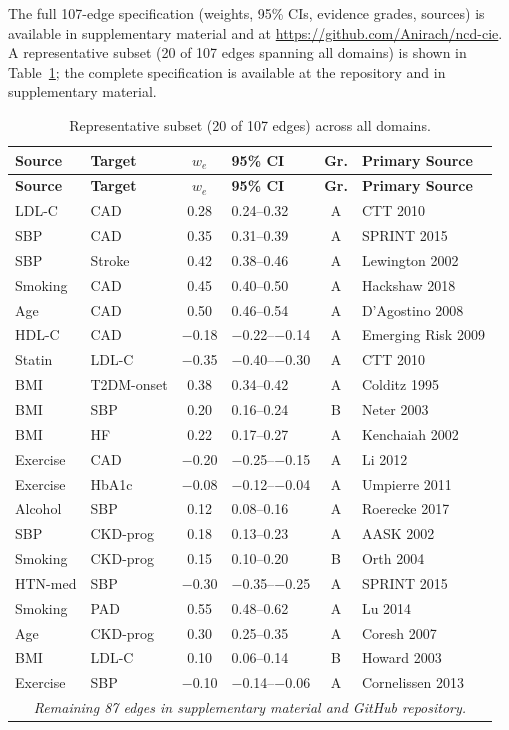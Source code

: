 \documentclass[runningheads]{llncs}
\begin{document}
The full 107-edge specification (weights, 95\% CIs, evidence grades,
sources) is available in supplementary material and at
\url{https://github.com/Anirach/ncd-cie}.
A representative subset (20 of 107 edges spanning all domains)
is shown in Table~\ref{tab:edges}; the complete specification is
available at the repository and in supplementary material.

{\footnotesize
\renewcommand{\arraystretch}{1.05}
\begin{longtable}{@{}p{2.0cm}p{2.0cm}cp{1.4cm}cp{2.8cm}@{}}
\caption{Representative subset (20 of 107 edges) across all domains.}\label{tab:edges}\\
\toprule
\textbf{Source} & \textbf{Target} & \textbf{$w_e$} & \textbf{95\% CI} & \textbf{Gr.} & \textbf{Primary Source} \\
\midrule
\endfirsthead
\toprule
\textbf{Source} & \textbf{Target} & \textbf{$w_e$} & \textbf{95\% CI} & \textbf{Gr.} & \textbf{Primary Source} \\
\midrule
\endhead
\bottomrule
\endlastfoot
LDL-C & CAD & 0.28 & 0.24--0.32 & A & CTT 2010 \\
SBP & CAD & 0.35 & 0.31--0.39 & A & SPRINT 2015 \\
SBP & Stroke & 0.42 & 0.38--0.46 & A & Lewington 2002 \\
Smoking & CAD & 0.45 & 0.40--0.50 & A & Hackshaw 2018 \\
Age & CAD & 0.50 & 0.46--0.54 & A & D'Agostino 2008 \\
HDL-C & CAD & $-$0.18 & $-$0.22--$-$0.14 & A & Emerging Risk 2009 \\
Statin & LDL-C & $-$0.35 & $-$0.40--$-$0.30 & A & CTT 2010 \\
BMI & T2DM-onset & 0.38 & 0.34--0.42 & A & Colditz 1995 \\
BMI & SBP & 0.20 & 0.16--0.24 & B & Neter 2003 \\
BMI & HF & 0.22 & 0.17--0.27 & A & Kenchaiah 2002 \\
Exercise & CAD & $-$0.20 & $-$0.25--$-$0.15 & A & Li 2012 \\
Exercise & HbA1c & $-$0.08 & $-$0.12--$-$0.04 & A & Umpierre 2011 \\
Alcohol & SBP & 0.12 & 0.08--0.16 & A & Roerecke 2017 \\
SBP & CKD-prog & 0.18 & 0.13--0.23 & A & AASK 2002 \\
Smoking & CKD-prog & 0.15 & 0.10--0.20 & B & Orth 2004 \\
HTN-med & SBP & $-$0.30 & $-$0.35--$-$0.25 & A & SPRINT 2015 \\
Smoking & PAD & 0.55 & 0.48--0.62 & A & Lu 2014 \\
Age & CKD-prog & 0.30 & 0.25--0.35 & A & Coresh 2007 \\
BMI & LDL-C & 0.10 & 0.06--0.14 & B & Howard 2003 \\
Exercise & SBP & $-$0.10 & $-$0.14--$-$0.06 & A & Cornelissen 2013 \\
\midrule
\multicolumn{6}{c}{\small\itshape Remaining 87 edges in supplementary material and GitHub repository.} \\
\end{longtable}
}
\end{document}
